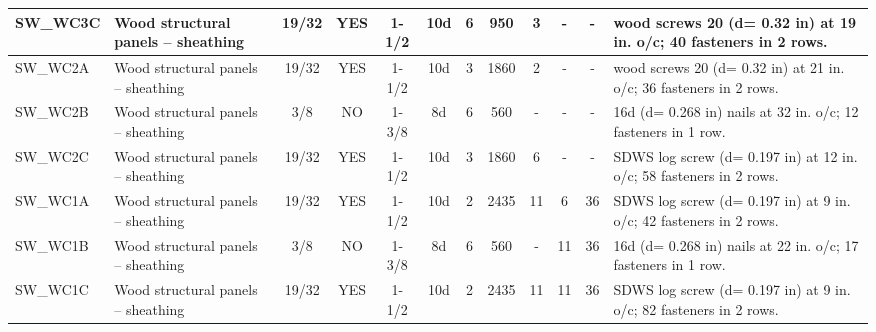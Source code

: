 \begin{center}
\begin{tiny}
\begin{longtable}{|l|p{1.5cm}|c|c|c|c|c|c|c|c|c|p{3cm}|}
\hline
SW\_WC3C & Wood structural panels – sheathing & 19/32 & YES & 1-1/2 & 10d & 6 & 950 & 3 & - & - & wood screws 20 (d= 0.32 in) at 19 in. o/c; 40 fasteners in 2 rows.\\
\hline
SW\_WC2A & Wood structural panels – sheathing & 19/32 & YES & 1-1/2 & 10d & 3 & 1860 & 2 & - & - & wood screws 20 (d= 0.32 in) at 21 in. o/c; 36 fasteners in 2 rows.\\
\hline
SW\_WC2B & Wood structural panels – sheathing & 3/8 & NO & 1-3/8 & 8d & 6 & 560 & - & - & - & 16d (d= 0.268 in) nails at 32 in. o/c; 12 fasteners in 1 row.\\
\hline
SW\_WC2C & Wood structural panels – sheathing & 19/32 & YES & 1-1/2 & 10d & 3 & 1860 & 6 & - & - & SDWS log screw (d= 0.197 in) at 12 in. o/c; 58 fasteners in 2 rows.\\
\hline
SW\_WC1A & Wood structural panels – sheathing & 19/32 & YES & 1-1/2 & 10d & 2 & 2435 & 11 & 6 & 36 & SDWS log screw (d= 0.197 in) at 9 in. o/c; 42 fasteners in 2 rows.\\
\hline
SW\_WC1B & Wood structural panels – sheathing & 3/8 & NO & 1-3/8 & 8d & 6 & 560 & - & 11 & 36 & 16d (d= 0.268 in) nails at 22 in. o/c; 17 fasteners in 1 row.\\
\hline
SW\_WC1C & Wood structural panels – sheathing & 19/32 & YES & 1-1/2 & 10d & 2 & 2435 & 11 & 11 & 36 & SDWS log screw (d= 0.197 in) at 9 in. o/c; 82 fasteners in 2 rows.\\
    \hline
  \end{longtable}
  \end{tiny}
  \end{center}
